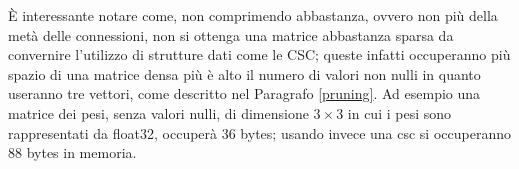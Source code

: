 \documentclass[12pt]{report}
\begin{document}


\par\null\par
\par\null\par
\par\null\par
\par\null\par

È interessante notare come, non comprimendo abbastanza, ovvero non più della metà delle connessioni, non si ottenga una matrice abbastanza sparsa da convernire l'utilizzo di strutture dati come le CSC; queste infatti occuperanno più spazio di una matrice densa più è alto il numero di valori non nulli in quanto useranno tre vettori, come descritto nel Paragrafo \ref{pruning}.
Ad esempio una matrice dei pesi, senza valori nulli, di dimensione $3 \times 3$ in cui i pesi sono rappresentati da float32, occuperà 36 bytes; usando invece una csc si occuperanno 88 bytes in memoria.

\newpage
\end{document}
